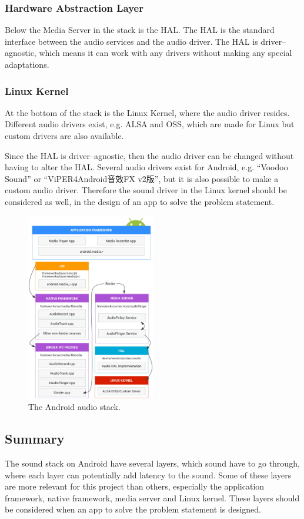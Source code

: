 \subsubsection*{Hardware Abstraction Layer}
Below the Media Server in the stack is the \ac{HAL}.
The \ac{HAL} is the standard interface between the audio services and the audio driver.
The \ac{HAL} is driver--agnostic, which means it can work with any drivers without making any special adaptations.

\subsubsection*{Linux Kernel}
At the bottom of the stack is the Linux Kernel, where the audio driver resides.
Different audio drivers exist, e.g. \ac{ALSA} and \ac{OSS}, which are made for Linux but custom drivers are also available.

Since the \ac{HAL} is driver--agnostic, then the audio driver can be changed without having to alter the \ac{HAL}.
Several audio drivers exist for Android, e.g. ``Voodoo Sound'' or ``ViPER4Android音效FX v2版'',
but it is also possible to make a custom audio driver\cite{voodoo_sound}\cite{viper4_android}.
Therefore the sound driver in the Linux kernel should be considered as well, in the design of an app to solve the problem statement.
\begin{figure}[!bht]
    \centering
    \includegraphics[width=0.5\textwidth]{img/sound_stack.png}
    \caption{The Android audio stack\cite{sound_stack}.}
    \label{fig:sound_stack}
\end{figure}

\subsection{Summary}
The sound stack on Android have several layers, which sound have to go through,
where each layer can potentially add latency to the sound.
Some of these layers are more relevant for this project than others,
especially the application framework, native framework, media server and Linux kernel.
These layers should be considered when an app to solve the problem statement is designed.


